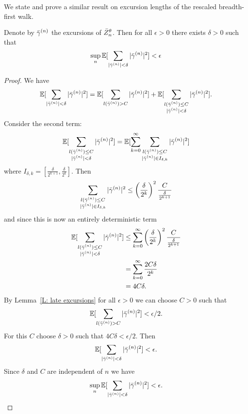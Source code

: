 We state and prove a similar result on excursion lengths of the rescaled breadth-first walk.
\begin{lemma} \label{L: sum rgamman}
	Denote by $\bar{\gamma}^{(n)}$ the excursions of $\bar{Z}^{\theta}_n$. 
	Then for all $\epsilon > 0$ there exists $\delta > 0$ such that
	\begin{equation}
		\sup_n \mathbb{E}[\sum_{|\bar{\gamma}^{(n)}| < \delta} |\bar{\gamma}^{(n)}|^2] < \epsilon
	\end{equation}
\end{lemma}
\begin{proof}
	We have
	\begin{equation}
		\mathbb{E}[\sum_{|\bar{\gamma}^{(n)}| < \delta} |\bar{\gamma}^{(n)}|^2] 
		= \mathbb{E}[\sum_{l(\bar{\gamma}^{(n)}) > C} |\bar{\gamma}^{(n)}|^2] 
		+ \mathbb{E}[\sum_{\substack{l(\bar{\gamma}^{(n)}) \leq C \\ |\bar{\gamma}^{(n)}| < \delta}} |\bar{\gamma}^{(n)}|^2].
	\end{equation}
	Consider the second term:
	\begin{equation}
		\mathbb{E}[\sum_{\substack{l(\bar{\gamma}^{(n)}) \leq C \\ |\bar{\gamma}^{(n)}| < \delta}} |\bar{\gamma}^{(n)}|^2]
		= \mathbb{E}[\sum_{k = 0}^{\infty} \sum_{\substack{l(\bar{\gamma}^{(n)}) \leq C \\ |\bar{\gamma}^{(n)}| \in I_{\delta, k}}} |\bar{\gamma}^{(n)}|^2]
	\end{equation}
	where $I_{\delta, k} = [ \frac{\delta}{2^{k+1}}, \frac{\delta}{2^{k}} ]$.
	Then
	\begin{equation}
		\sum_{\substack{l(\bar{\gamma}^{(n)}) \leq C \\ |\bar{\gamma}^{(n)}| \in I_{\delta, k}}} |\bar{\gamma}^{(n)}|^2 
		\leq \left(\frac{\delta}{2^k}\right)^2 \frac{C}{\frac{\delta}{2^{k+1}}}
	\end{equation}
	and since this is now an entirely deterministic term
	\begin{equation}
	\begin{aligned}
	\mathbb{E}[\sum_{\substack{l(\bar{\gamma}^{(n)}) \leq C \\ |\bar{\gamma}^{(n)}| < \delta}} |\bar{\gamma}^{(n)}|^2] 
	&\leq \sum_{k = 0}^{\infty} \left(\frac{\delta}{2^k}\right)^2 \frac{C}{\frac{\delta}{2^{k+1}}} \\
	&= \sum_{k = 0}^{\infty} \frac{2C\delta}{2^k} \\
	&= 4C\delta.
	\end{aligned}
	\end{equation}
	By Lemma~\ref{L: late excursions} for all $\epsilon > 0$ we can choose $C > 0$ such that 
	\begin{equation}
		\mathbb{E}[ \sum_{l(\bar{\gamma}^{(n)}) > C} |\bar{\gamma}^{(n)}|^2 ] < \epsilon / 2.
	\end{equation}
	For this $C$ choose $\delta > 0$ such that $4C\delta < \epsilon/2$.
	Then
	\begin{equation}
		\mathbb{E}[\sum_{|\bar{\gamma}^{(n)}| < \delta} |\bar{\gamma}^{(n)}|^2]  < \epsilon.
	\end{equation}
	Since $\delta$ and $C$ are independent of $n$ we have
	\begin{equation}
	\sup_n \mathbb{E}[\sum_{|\bar{\gamma}^{(n)}| < \delta} |\bar{\gamma}^{(n)}|^2] < \epsilon.
	\end{equation}
\end{proof}


